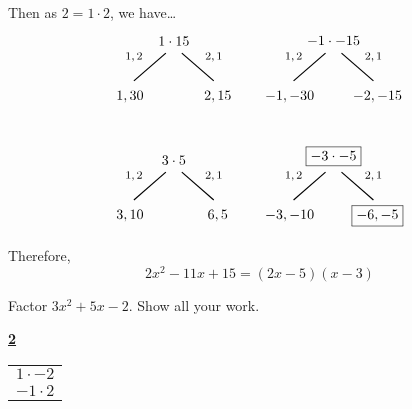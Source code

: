 \documentclass[11pt,letterpaper]{article}
\begin{document}
Then as $2= 1 \cdot 2$, we have\dots
	\[
	\begin{tikzpicture}
	\node at (0,0) {$1 \cdot 15$};
	\node at (-1.0,-0.4) {\footnotesize$1, 2$};
	\draw[line width=0.03cm,label={1}] (-0.2,-0.3) -- (-1,-1);
	\node at (-1.1,-1.4) {$1, 30$};
	\node at (1.0,-0.4) {\footnotesize$2,1$};
	\draw[line width=0.03cm] (0.2,-0.3) -- (1,-1);
	\node at (1.1,-1.4) {$2, 15$};	
	
	\tikzset{shift={(4,0)}}

	\node at (0,0) {$-1 \cdot -15$};
	\node at (-1.0,-0.4) {\footnotesize$1, 2$};
	\draw[line width=0.03cm,label={1}] (-0.2,-0.3) -- (-1,-1);
	\node at (-1.1,-1.4) {$-1, -30$};
	\node at (1.0,-0.4) {\footnotesize$2,1$};
	\draw[line width=0.03cm] (0.2,-0.3) -- (1,-1);
	\node at (1.1,-1.4) {$-2, -15$};

	\tikzset{shift={(-4,-3)}}

	\node at (0,0) {$3 \cdot 5$};
	\node at (-1.0,-0.4) {\footnotesize$1, 2$};
	\draw[line width=0.03cm,label={1}] (-0.2,-0.3) -- (-1,-1);
	\node at (-1.1,-1.4) {$3, 10$};
	\node at (1.0,-0.4) {\footnotesize$2,1$};
	\draw[line width=0.03cm] (0.2,-0.3) -- (1,-1);
	\node at (1.1,-1.4) {$6, 5$};

	\tikzset{shift={(4,0)}}

	\node at (0,0.1) {\framebox{$-3 \cdot -5$}};
	\node at (-1.0,-0.4) {\footnotesize$1, 2$};
	\draw[line width=0.03cm,label={1}] (-0.2,-0.3) -- (-1,-1);
	\node at (-1.1,-1.4) {$-3, -10$};
	\node at (1.0,-0.4) {\footnotesize$2,1$};
	\draw[line width=0.03cm] (0.2,-0.3) -- (1,-1);
	\node at (1.1,-1.4) {\framebox{$-6, -5$}};
	\end{tikzpicture}
	\]

Therefore, 
	\[
	2x^2 - 11x + 15= (2x - 5)(x - 3)
	\]




\newpage





 Factor $3x^2 + 5x - 2$. Show all your work. \pspace

\sol 
	\begin{table}[!ht]
	\centering
	\underline{\bfseries 2} \pvspace{0.1cm}
	\begin{tabular}{c}
	$1 \cdot -2$ \\
	$-1 \cdot 2$
	\end{tabular}
	\end{table}
\end{document}
